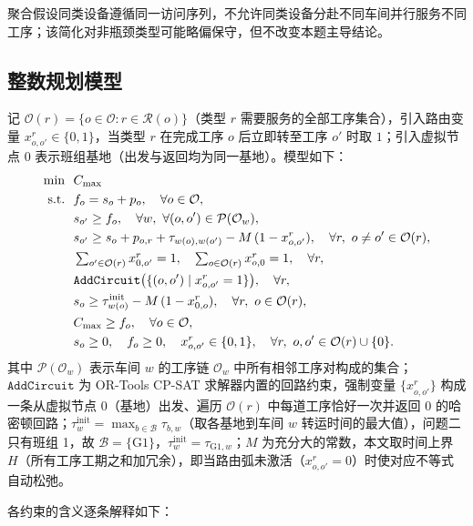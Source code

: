 \documentclass[12pt,a4paper]{ctexart}
\begin{document}
聚合假设同类设备遵循同一访问序列，不允许同类设备分赴不同车间并行服务不同工序；该简化对非瓶颈类型可能略偏保守，但不改变本题主导结论。

\subsection{整数规划模型}
记 $\mathcal{O}(r)=\{o\in\mathcal{O}:r\in\mathcal{R}(o)\}$（类型 $r$ 需要服务的全部工序集合），引入路由变量 $x^{r}_{o,o'}\in\{0,1\}$，当类型 $r$ 在完成工序 $o$ 后立即转至工序 $o'$ 时取 $1$；引入虚拟节点 $0$ 表示班组基地（出发与返回均为同一基地）。模型如下：
\begin{align}
\min~~ & C_{\max} \label{eq:obj}\\
\text{s.t.}~~ & f_o = s_o + p_o, \quad \forall o\in\mathcal{O}, \label{eq:def}\\
& s_{o'} \ge f_o, \quad \forall w,\ \forall (o,o')\in\mathcal{P}(\mathcal{O}_w), \label{eq:prec}\\
& s_{o'} \ge s_o + p_{o,r} + \tau_{w(o),w(o')} - M\,(1-x^{r}_{o,o'}), \quad \forall r,\ o\neq o'\in\mathcal{O}(r), \label{eq:disj}\\
& \textstyle\sum_{o'\in\mathcal{O}(r)} x^{r}_{0,o'} = 1,\quad \sum_{o\in\mathcal{O}(r)} x^{r}_{o,0}=1, \quad \forall r, \label{eq:flow}\\
& \texttt{AddCircuit}\big(\{(o,o')\mid x^{r}_{o,o'}=1\}\big), \quad \forall r, \label{eq:circuit}\\
& s_o \ge \tau^{\mathrm{init}}_{w(o)} - M\,(1-x^{r}_{0,o}), \quad \forall r,\ o\in\mathcal{O}(r), \label{eq:init}\\
& C_{\max} \ge f_o, \quad \forall o\in\mathcal{O}, \label{eq:cmax}\\
& s_o\ge 0,\quad f_o\ge 0,\quad x^{r}_{o,o'}\in\{0,1\}, \quad \forall r,\ o,o'\in\mathcal{O}(r)\cup\{0\}. \notag
\end{align}
其中 $\mathcal{P}(\mathcal{O}_w)$ 表示车间 $w$ 的工序链 $\mathcal{O}_w$ 中所有相邻工序对构成的集合；$\texttt{AddCircuit}$ 为 OR-Tools CP-SAT 求解器内置的回路约束，强制变量 $\{x^{r}_{o,o'}\}$ 构成一条从虚拟节点 $0$（基地）出发、遍历 $\mathcal{O}(r)$ 中每道工序恰好一次并返回 $0$ 的哈密顿回路；$\tau^{\mathrm{init}}_{w}=\max_{b\in\mathcal{B}}\tau_{b,w}$（取各基地到车间 $w$ 转运时间的最大值），问题二只有班组 1，故 $\mathcal{B}=\{\mathrm{G1}\}$，$\tau^{\mathrm{init}}_{w}=\tau_{\mathrm{G1},w}$；$M$ 为充分大的常数，本文取时间上界 $H$（所有工序工期之和加冗余），即当路由弧未激活（$x^{r}_{o,o'}=0$）时使对应不等式自动松弛。

\medskip
\noindent 各约束的含义逐条解释如下：
\end{document}

